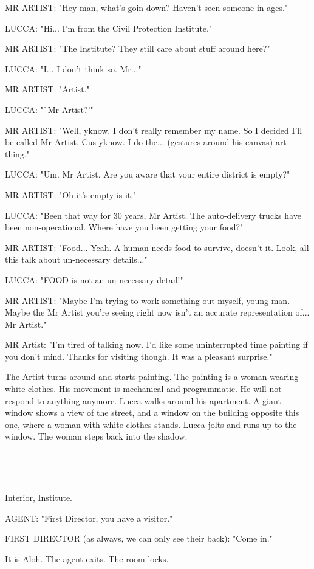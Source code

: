 \documentclass[11pt]{article}
\begin{document}
MR ARTIST: "Hey man, what's goin down?
Haven't seen someone in ages."

LUCCA: "Hi... I'm from the Civil Protection Institute."

MR ARTIST: "The Institute? 
They still care about stuff around here?"

LUCCA: "I... I don't think so. Mr..."

MR ARTIST: "Artist."

LUCCA: "`Mr Artist?'"

MR ARTIST: "Well, yknow. 
I don't really remember my name. So I decided I'll be called Mr Artist.
Cus yknow. I do the... (gestures around his canvas) art thing."

LUCCA: "Um. Mr Artist. Are you aware that your entire district is empty?"

MR ARTIST: "Oh it's empty is it."

LUCCA: "Been that way for 30 years, Mr Artist.
The auto-delivery trucks have been non-operational. 
Where have you been getting your food?"

MR ARTIST: "Food... Yeah. A human needs food to survive, doesn't it.
Look, all this talk about un-necessary details..."

LUCCA: "FOOD is not an un-necessary detail!"

MR ARTIST: "Maybe I'm trying to work something out myself, young man. 
Maybe the Mr Artist you're seeing right now isn't an accurate representation of... Mr Artist."

MR Artist: "I’m tired of talking now. 
I’d like some uninterrupted time painting if you don’t mind. 
Thanks for visiting though. 
It was a pleasant surprise."

The Artist turns around and starts painting. 
The painting is a woman wearing white clothes. 
His movement is mechanical and programmatic. 
He will not respond to anything anymore. 
Lucca walks around his apartment. 
A giant window shows a view of the street, and a window on the building opposite this one, where a woman with white clothes stands. 
Lucca jolts and runs up to the window. 
The woman steps back into the shadow. 

\ 

\ 

Interior, Institute.

AGENT: "First Director, you have a visitor."

FIRST DIRECTOR (as always, we can only see their back): "Come in."

It is Aloh.
The agent exits. The room locks.
\end{document}
